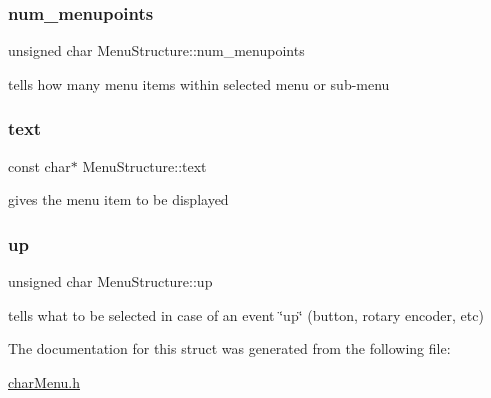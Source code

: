 \subsubsection{\texorpdfstring{num\_menupoints}{num\_menupoints}}
{\footnotesize\ttfamily unsigned char Menu\+Structure\+::num\+\_\+menupoints}

tells how many menu items within selected menu or sub-\/menu \mbox{\label{struct_menu_structure_a0726774a008bbbd0740ce033cd5b7c7a}} 
\subsubsection{\texorpdfstring{text}{text}}
{\footnotesize\ttfamily const char$\ast$ Menu\+Structure\+::text}

gives the menu item to be displayed \mbox{\label{struct_menu_structure_ac983323a9dfb0e5b141bd9f06c7f2d94}} 
\subsubsection{\texorpdfstring{up}{up}}
{\footnotesize\ttfamily unsigned char Menu\+Structure\+::up}

tells what to be selected in case of an event \char`\"{}up\char`\"{} (button, rotary encoder, etc) 

The documentation for this struct was generated from the following file\+:\begin{DoxyCompactItemize}
\item 
\mbox{\hyperlink{char_menu_8h}{char\+Menu.\+h}}\end{DoxyCompactItemize}
